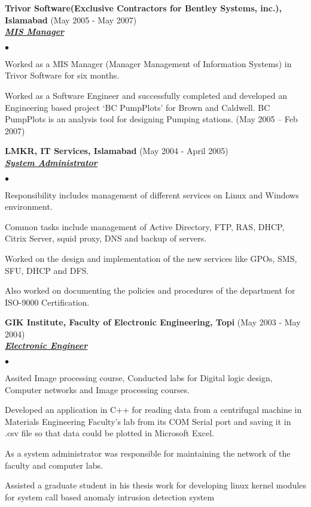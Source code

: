 \documentclass{article}
\newcommand{\employer}[3]{{ \textbf{#1} (#2)\\ \underline{\textbf{\emph{#3}}}\\  }}
\newenvironment{achievements}{\begin{list}{$\bullet$}{\topsep 0pt \itemsep -2pt}}{\vspace*{4pt}\end{list}}
\begin{document}
\employer{Trivor Software(Exclusive Contractors for Bentley Systems, inc.), Islamabad}{May 2005 - May 2007}{MIS Manager}
	\begin{achievements}
	\item Worked as a MIS Manager (Manager Management of Information Systems) in Trivor Software for six months.  
	\item Worked as a Software Engineer and successfully completed and developed an Engineering based project ‘BC PumpPlots’ for Brown and Caldwell. BC PumpPlots is an analysis tool for designing Pumping stations. (May 2005 – Feb 2007) 
	\end{achievements}

\employer{LMKR, IT Services, Islamabad}{May 2004 - April 2005}{System Administrator}
	\begin{achievements}
	\item Responsibility includes management of different services on Linux and Windows environment.
	\item Common tasks include management of Active Directory, FTP, RAS, DHCP, Citrix Server, squid proxy, DNS and backup of servers.
	\item Worked on the design and implementation of the new services like GPOs, SMS, SFU, DHCP and DFS. 
	\item Also worked on documenting the policies and procedures of the department for ISO-9000 Certification. 
	\end{achievements}

\employer{GIK Institute, Faculty of Electronic Engineering, Topi}{May 2003 - May 2004}{Electronic Engineer}
	\begin{achievements}
	\item Assited Image processing course, Conducted labs for Digital logic design, Computer networks and Image processing courses.
	\item Developed an application in C++ for reading data from a centrifugal machine in Materials Engineering Faculty’s lab from its COM Serial port and saving it in .csv file so that data could be plotted in Microsoft Excel.
	\item As a system administrator was responsible for maintaining the network of the faculty and computer labs.
	\item Assisted a graduate student in his thesis work for developing linux kernel modules for system call based anomaly intrusion detection system
	\end{achievements}
\end{document}
